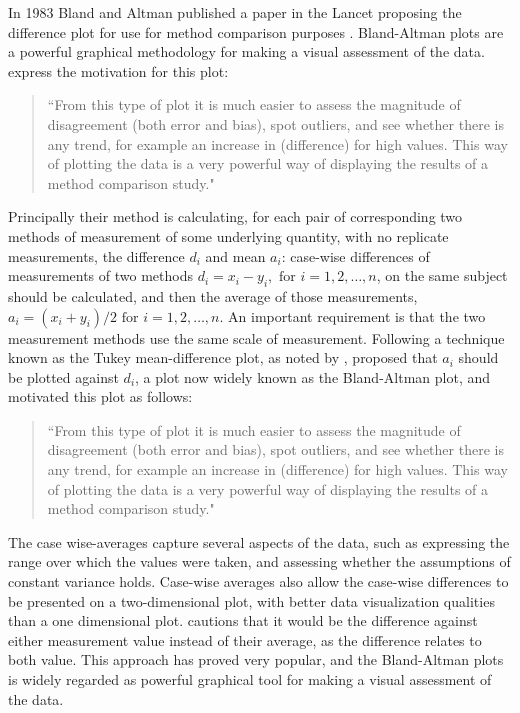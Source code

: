 \documentclass[12pt, a4paper]{report}
\theoremstyle{plain}
\theoremstyle{definition}
\theoremstyle{remark}
\begin{document}
	
	In 1983 Bland and Altman published a paper in the Lancet proposing the difference plot for use for method comparison purposes \citep{BA83}. 	Bland-Altman plots are a powerful graphical methodology for making
	a visual assessment of the data. \citet*{BA83} express the
	motivation for this plot:
	\begin{quote}
		``From this type of plot it is much easier to assess the magnitude
		of disagreement (both error and bias), spot outliers, and see
		whether there is any trend, for example an increase in
		(difference) for high values. This way of plotting the data is a
		very powerful way of displaying the results of a method comparison
		study."
	\end{quote}
	Principally their method is calculating, for each pair of corresponding two methods of measurement of some underlying quantity, with no replicate measurements, the difference $d_i$ and mean $a_i$: case-wise differences of measurements of two methods $d_{i} = x_{i}-y_{i}, \mbox{ for }i=1,2,\dots,n$, on the same subject
	should be calculated, and then the average of those measurements, 
	$a_{i} = (x_{i} + y_{i})/2 \mbox{ for }i=1,2,\dots, n$. An important requirement is that the two measurement methods use the same scale of measurement. Following a technique known as the Tukey mean-difference plot, as noted by \citet{kozak2014including}, \citet{BA83} proposed that $a_i$ should be plotted against $d_i$, a plot now widely known as the Bland-Altman plot, and motivated this plot as follows:
	\begin{quote}
		``From this type of plot it is much easier to assess the magnitude
		of disagreement (both error and bias), spot outliers, and see
		whether there is any trend, for example an increase in (difference) for high values. This way of plotting the data is a very powerful way of displaying the results of a method comparison study."
	\end{quote}
	
	The case wise-averages capture several aspects of the data, such as expressing the range over which the values were taken, and assessing whether the assumptions of constant variance holds. Case-wise averages also allow the case-wise differences to be presented on a two-dimensional plot, with better data visualization qualities than a one dimensional plot. \citet{BA86}
	cautions that it would be the difference against either measurement value instead of their average, as the difference relates to both value. This approach has proved very popular, and the Bland-Altman plots is widely regarded as powerful graphical tool for making a visual assessment of the data.
	
\end{document}
